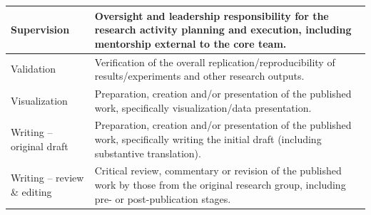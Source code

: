 \documentclass{wpom-upv}
\begin{document}
{\begin{table}[ht]
\begin{minipage}{\columnwidth}
\begin{tabularx}{\columnwidth}{lX}
	\midrule
	Supervision             & Oversight and leadership responsibility for the research activity planning and execution, including mentorship external to the core team. \\
	\midrule
	Validation              & Verification of the overall replication/reproducibility of results/experiments and other research outputs. \\
	\midrule
	Visualization           & Preparation, creation and/or presentation of the published work, specifically visualization/data presentation. \\
	\midrule
	Writing -- original draft     & Preparation, creation and/or presentation of the published work, specifically writing the initial draft (including substantive translation). \\
	\midrule
	Writing -- review \& editing  & Critical review, commentary or revision of the published work by those from the original research group, including pre- or post-publication stages. \\
	\bottomrule
\end{tabularx}
\end{minipage}
\end{table}

}


\printbibliography

\end{document}
